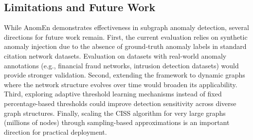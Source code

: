 \documentclass[10pt,twocolumn,a4paper]{article}
\begin{document}
\subsection{Limitations and Future Work}

While AnomEn demonstrates effectiveness in subgraph anomaly detection, several directions for future work remain. First, the current evaluation relies on synthetic anomaly injection due to the absence of ground-truth anomaly labels in standard citation network datasets. Evaluation on datasets with real-world anomaly annotations (e.g., financial fraud networks, intrusion detection datasets) would provide stronger validation. Second, extending the framework to dynamic graphs where the network structure evolves over time would broaden its applicability. Third, exploring adaptive threshold learning mechanisms instead of fixed percentage-based thresholds could improve detection sensitivity across diverse graph structures. Finally, scaling the CISS algorithm for very large graphs (millions of nodes) through sampling-based approximations is an important direction for practical deployment.




 

\end{document}
